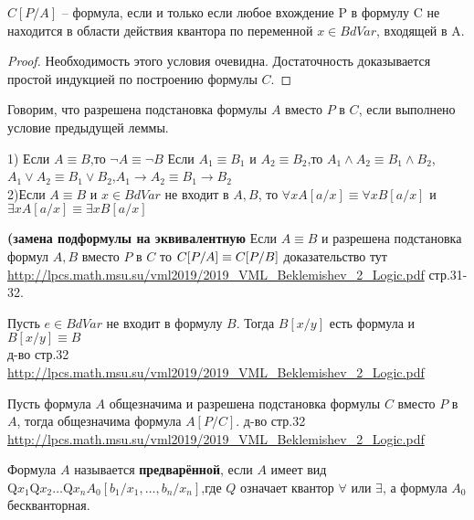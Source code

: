 \begin{lemma}
    $C[P/A]$ -- формула, если и только если любое вхождение P в формулу C не находится в области действия квантора по переменной $x\in BdVar$, входящей в A.
\end{lemma}
\begin{proof}
     Необходимость этого условия очевидна. Достаточность доказывается простой индукцией по построению формулы $C$.
\end{proof}
\begin{definition}
    Говорим, что разрешена подстановка формулы $A$ вместо $P$ в $C$, если выполнено условие предыдущей леммы.
\end{definition}
\begin{lemma}
    1) Если $A\equiv B$,то $\neg A \equiv \neg B$ Если $A_1\equiv B_1$ и $A_2\equiv B_2$,то $A_1\wedge A_2\equiv B_1 \wedge B_2$,$A_1\lor A_2\equiv B_1 \lor B_2$,$A_1\rightarrow A_2\equiv B_1 \rightarrow B_2$\\
    2)Если $A\equiv B$ и $x \in BdVar$ не входит в $A,B$, то $\forall x A[a / x] \equiv \forall x B[a / x]$ и $\exists x A[a / x] \equiv \exists x B[a / x]$
\end{lemma}
\begin{theorem}
    \textbf{(замена подформулы на эквивалентную} Если $A \equiv B$ и разрешена подстановка формул $A,B$ вместо $P$ в $C$ то $C[P/A]\equiv C[P/B]\\$
    доказательство тут \url{http://lpcs.math.msu.su/vml2019/2019_VML_Beklemishev_2_Logic.pdf} стр.31-32.
\end{theorem}
\begin{lemma}
    Пусть $e\in BdVar$ не входит в формулу $B$. Тогда $B[x/y]$ есть формула и $B[x/y] \equiv B$ \\
    д-во стр.32 \url{http://lpcs.math.msu.su/vml2019/2019_VML_Beklemishev_2_Logic.pdf} 
\end{lemma}
\begin{theorem}
    Пусть формула $A$ общезначима и разрешена подстановка формулы $C$ вместо $P$ в $A$, тогда общезначима формула $A[P/C]$.
     д-во стр.32 \url{http://lpcs.math.msu.su/vml2019/2019_VML_Beklemishev_2_Logic.pdf} 
\end{theorem}
\begin{definition}
    Формула $A$ называется \textbf{предварённой}, если $A$ имеет вид $\mathrm{Q} x_{1} \mathrm{Q} x_{2} \ldots \mathrm{Q} x_{n} A_{0}\left[b_{1} / x_{1}, \ldots, b_{n} / x_{n}\right]$,где $Q$ означает квантор $\forall$ или $\exists$, а формула $A_0$ бескванторная.
\end{definition}
